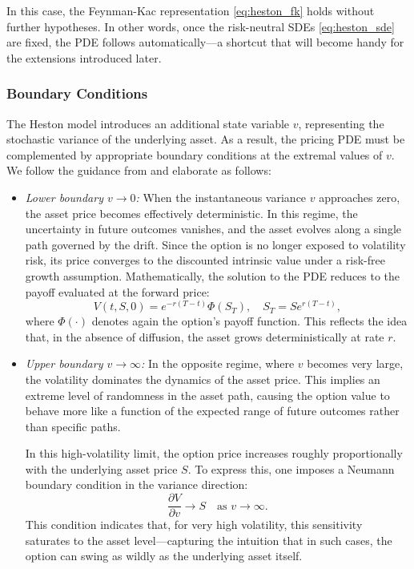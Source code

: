 \documentclass[12pt]{report} %
\theoremstyle{plain} %
\theoremstyle{definition} %
\theoremstyle{remark} %
\begin{document}
In this case, the Feynman-Kac representation \eqref{eq:heston_fk} holds without further hypotheses. In other words, once the
risk-neutral SDEs \eqref{eq:heston_sde} are fixed, the PDE follows automatically—a shortcut that
will become handy for the extensions introduced later.

\subsubsection{Boundary Conditions}

The Heston model introduces an additional state variable $v$, representing the stochastic 
variance of the underlying asset. As a result, the pricing PDE must be complemented by 
appropriate boundary conditions at the extremal values of $v$. We follow the 
guidance from \cite{duffy2022numerical} and elaborate as follows:

\begin{itemize}
    \item \textit{Lower boundary $v \to 0$:} 
    When the instantaneous variance $v$ approaches zero, the asset price becomes 
	effectively deterministic. In this regime, the uncertainty in future outcomes 
	vanishes, and the asset evolves along a single path governed by the drift. Since the 
	option is no longer exposed to volatility risk, its price converges to the 
	discounted intrinsic value under a risk-free growth assumption. Mathematically, the 
	solution to the PDE reduces to the payoff evaluated at the forward price:
    \[
        V(t, S, 0) = e^{-r(T - t)} \Phi(S_T), \quad S_T = S e^{r(T - t)},
    \]
    where $\Phi(\cdot)$ denotes again the option's payoff function. This reflects the idea that, 
	in the absence of diffusion, the asset grows deterministically at rate $r$.

    \item \textit{Upper boundary $v \to \infty$:} 
    In the opposite regime, where $v$ becomes very large, the volatility dominates the 
	dynamics of the asset price. This implies an extreme level of randomness in the asset path, 
	causing the option value to behave more like a function of the expected range of future 
	outcomes rather than specific paths.

    In this high-volatility limit, the option price increases roughly proportionally with 
	the underlying asset price $S$. To express this, one imposes a Neumann boundary condition 
	in the variance direction:
    \[
        \frac{\partial V}{\partial v} \to S \quad \text{as } v \to \infty.
    \]
    This condition indicates that, for very high volatility, this sensitivity saturates to the 
	asset level—capturing the intuition that in such cases, the option can swing as wildly 
	as the underlying asset itself.

\end{itemize}
\end{document}
